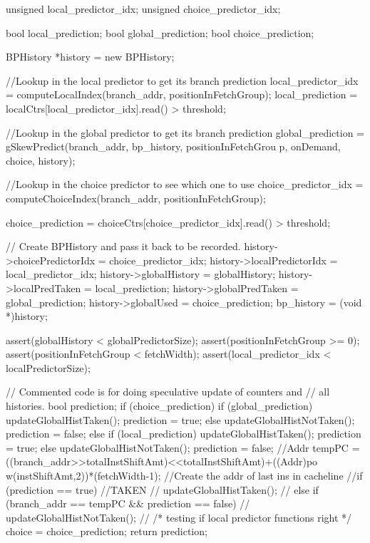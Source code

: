 \begin{DoxyCode}
{
    unsigned local_predictor_idx;
    unsigned choice_predictor_idx;

    bool local_prediction;
    bool global_prediction;
    bool choice_prediction;

    BPHistory *history = new BPHistory;

    //Lookup in the local predictor to get its branch prediction
    local_predictor_idx = computeLocalIndex(branch_addr, positionInFetchGroup);
    local_prediction = localCtrs[local_predictor_idx].read() > threshold;

    //Lookup in the global predictor to get its branch prediction
    global_prediction = gSkewPredict(branch_addr, bp_history, positionInFetchGrou
      p, onDemand, choice, history);

    //Lookup in the choice predictor to see which one to use
    choice_predictor_idx = computeChoiceIndex(branch_addr, positionInFetchGroup);
      
    choice_prediction = choiceCtrs[choice_predictor_idx].read() > threshold;

    // Create BPHistory and pass it back to be recorded.
    history->choicePredictorIdx = choice_predictor_idx;
    history->localPredictorIdx  = local_predictor_idx;
    history->globalHistory = globalHistory;
    history->localPredTaken = local_prediction;
    history->globalPredTaken = global_prediction;
    history->globalUsed = choice_prediction;
    bp_history = (void *)history;

    assert(globalHistory < globalPredictorSize);
    assert(positionInFetchGroup >= 0);
    assert(positionInFetchGroup < fetchWidth);
    assert(local_predictor_idx < localPredictorSize);

    // Commented code is for doing speculative update of counters and
    // all histories.
        bool prediction;
    if (choice_prediction) {
        if (global_prediction) {
                        updateGlobalHistTaken();
                        prediction = true;
        } else {
                        updateGlobalHistNotTaken();
                        prediction = false;
        }
    } else {
        if (local_prediction) {
                        updateGlobalHistTaken();
                        prediction = true;
        } else {
                        updateGlobalHistNotTaken();
                        prediction = false;
        }
    }
  //Addr tempPC = ((branch_addr>>totalInstShiftAmt)<<totalInstShiftAmt)+((Addr)po
      w(instShiftAmt,2))*(fetchWidth-1); //Create the addr of last ins in cacheline
  //if (prediction == true) { //TAKEN
  //    updateGlobalHistTaken();
  //} else if (branch_addr == tempPC && prediction == false) {
  //    updateGlobalHistNotTaken();
  //}
    /* testing if local predictor functions right */
        choice = choice_prediction;
    return prediction;
}
\end{DoxyCode}
